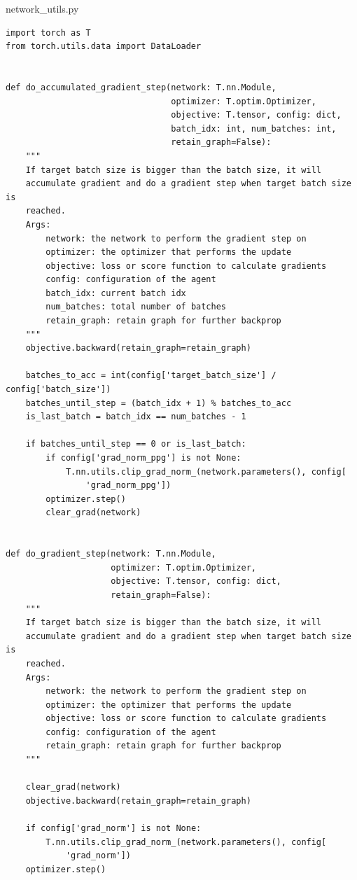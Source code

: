 \documentclass{article}
\begin{document}
network\_utils.py
\begin{lstlisting}
import torch as T
from torch.utils.data import DataLoader


def do_accumulated_gradient_step(network: T.nn.Module,
                                 optimizer: T.optim.Optimizer,
                                 objective: T.tensor, config: dict,
                                 batch_idx: int, num_batches: int,
                                 retain_graph=False):
    """
    If target batch size is bigger than the batch size, it will
    accumulate gradient and do a gradient step when target batch size is
    reached.
    Args:
        network: the network to perform the gradient step on
        optimizer: the optimizer that performs the update
        objective: loss or score function to calculate gradients
        config: configuration of the agent
        batch_idx: current batch idx
        num_batches: total number of batches
        retain_graph: retain graph for further backprop
    """
    objective.backward(retain_graph=retain_graph)

    batches_to_acc = int(config['target_batch_size'] / config['batch_size'])
    batches_until_step = (batch_idx + 1) % batches_to_acc
    is_last_batch = batch_idx == num_batches - 1

    if batches_until_step == 0 or is_last_batch:
        if config['grad_norm_ppg'] is not None:
            T.nn.utils.clip_grad_norm_(network.parameters(), config[
                'grad_norm_ppg'])
        optimizer.step()
        clear_grad(network)


def do_gradient_step(network: T.nn.Module,
                     optimizer: T.optim.Optimizer,
                     objective: T.tensor, config: dict,
                     retain_graph=False):
    """
    If target batch size is bigger than the batch size, it will
    accumulate gradient and do a gradient step when target batch size is
    reached.
    Args:
        network: the network to perform the gradient step on
        optimizer: the optimizer that performs the update
        objective: loss or score function to calculate gradients
        config: configuration of the agent
        retain_graph: retain graph for further backprop
    """

    clear_grad(network)
    objective.backward(retain_graph=retain_graph)

    if config['grad_norm'] is not None:
        T.nn.utils.clip_grad_norm_(network.parameters(), config[
            'grad_norm'])
    optimizer.step()



\end{lstlisting}
\end{document}
